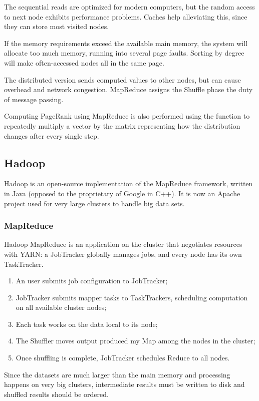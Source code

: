 The sequential reads are optimized for modern computers, but the random access to next node exhibits performance problems. Caches help alleviating this, since they can store most visited nodes.

If the memory requirements exceed the available main memory, the system will allocate too much memory, running into several page faults. Sorting by degree will make often-accessed nodes all in the same page.

The distributed version sends computed values to other nodes, but can cause overhead and network congestion. MapReduce assigns the Shuffle phase the duty of message passing.

Computing PageRank using MapReduce is also performed using the function to repeatedly multiply a vector by the matrix representing how the distribution changes after every single step.

\subsection{Hadoop}
Hadoop is an open-source implementation of the MapReduce framework, written in Java (opposed to the proprietary of Google in C++). It is now an Apache project used for very large clusters to handle big data sets.

\subsubsection{MapReduce}
Hadoop MapReduce is an application on the cluster that negotiates resources with YARN: a JobTracker globally manages jobs, and every node has its own TaskTracker.

\begin{enumerate}
	\item An user submits job configuration to JobTracker;
	\item JobTracker submits mapper tasks to TaskTrackers, scheduling computation on all available cluster nodes;
	\item Each task works on the data local to its node;
	\item The Shuffler moves output produced my Map among the nodes in the cluster;
	\item Once shuffling is complete, JobTracker schedules Reduce to all nodes.
\end{enumerate}

Since the datasets are much larger than the main memory and processing happens on very big clusters, intermediate results must be written to disk and shuffled results should be ordered.

